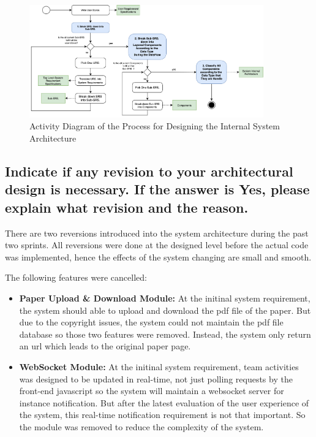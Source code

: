 \documentclass[conference]{IEEEtran}
\begin{document}
\begin{figure}[!ht]
	\centering
	\includegraphics[width=0.9\textwidth]{arch-process.png}
	\caption{Activity Diagram of the Process for Designing the Internal System Architecture}
	\label{fig:arch-process}
\end{figure}

\subsection{Indicate if any revision to your architectural design is necessary. If the answer is Yes, please explain what revision and the reason. }
\label{sec:1.2}

There are two reversions introduced into the system architecture during the past two sprints.
All reversions were done at the designed level before the actual code was implemented,
hence the effects of the system changing are small and smooth.

The following features were cancelled:

\begin{itemize}
	\item \textbf{Paper Upload \& Download Module:} At the initinal system requirement, the system should able to upload and download the pdf file of the paper.
	      But due to the copyright issues, the system could not maintain the pdf file database so those two features were removed.
	      Instead, the system only return an url which leads to the original paper page.
	\item \textbf{WebSocket Module:} At the initinal system requirement, team activities was designed to be updated in real-time,
	      not just polling requests by the front-end javascript so the system will maintain a websocket server for instance notification.
	      But after the latest evaluation of the user experience of the system, this real-time notification requirement is not that important.
	      So the module was removed to reduce the complexity of the system.
\end{itemize}
\end{document}
